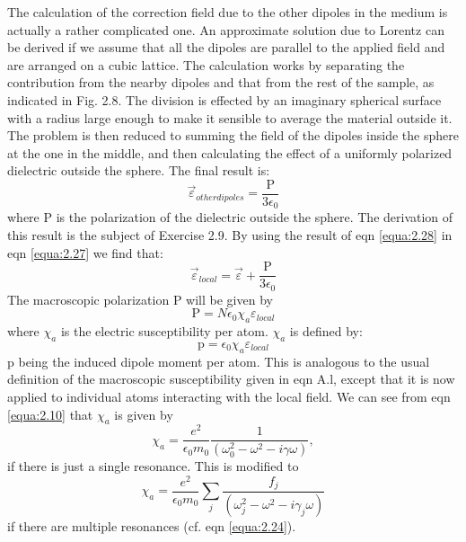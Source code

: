 \documentclass[12pt]{book}
\begin{document}
The calculation of the correction field due to the other dipoles in the medium is actually a rather complicated one. An approximate solution due to Lorentz can be derived if we assume that all the dipoles are parallel to the applied field and are arranged on a cubic lattice. The calculation works by separating the contribution from the nearby dipoles and that from the rest of the sample, as indicated in Fig. 2.8. The division is effected by an imaginary spherical surface with a radius large enough to make it sensible to average the material outside it. The problem is then reduced to summing the field of the dipoles inside the sphere at the one in the middle, and then calculating the effect of a uniformly polarized dielectric outside the sphere. The final result is:
\begin{equation}\label{equa:2.28}
  \vec{\varepsilon}_{other dipoles}=\frac{\mathrm{P}}{3\epsilon_0}
\end{equation}
where $\mathrm{P}$ is the polarization of the dielectric outside the sphere. The derivation of this result is the subject of Exercise 2.9. By using the result of eqn \ref{equa:2.28} in eqn \ref{equa:2.27} we find that:
\begin{equation}\label{equa:2.29}
  \vec{\varepsilon}_{local}=\vec{\varepsilon}+\frac{\mathrm{P}}{3\epsilon_0}
\end{equation}
The macroscopic polarization $\mathrm{P}$ will be given by
\begin{equation}\label{equa:2.30}
  \mathrm{P}=N\epsilon_0\chi_a\varepsilon_{local}
\end{equation}
where $\chi_a$ is the electric susceptibility per atom. $\chi_a$ is defined by:
\begin{equation}\label{equa:2.31}
  \mathrm{p}=\epsilon_0\chi_a\varepsilon_{local}
\end{equation}
$\mathrm{p}$ being the induced dipole moment per atom. This is analogous to the usual definition of the macroscopic susceptibility given in eqn A.l, except that it is now applied to individual atoms interacting with the local field. We can see from eqn \ref{equa:2.10} that $\chi_a$ is given by
\begin{equation}\label{equa:2.32}
  \chi_a=\frac{e^2}{\epsilon_0m_0}\frac{1}{(\omega_0^2-\omega^2-i\gamma\omega)},
\end{equation}
if there is just a single resonance. This is modified to
\begin{equation}\label{equa:2.33}
  \chi_a=\frac{e^2}{\epsilon_0m_0}\sum_j\frac{f_j}{(\omega_j^2-\omega^2-i\gamma_j\omega)}
\end{equation}
if there are multiple resonances (cf. eqn \ref{equa:2.24}).
\end{document}
